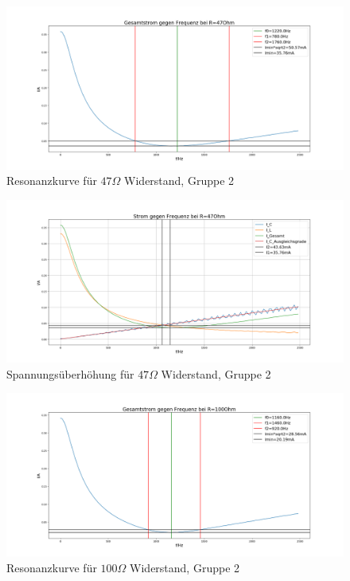 \documentclass[a4paper, 11pt]{article}
\begin{document}
\begin{figure}[H]
	\hskip-2cm
	\includegraphics[trim = 0mm 0mm 0mm 0mm,clip, width=20cm]{Bilder/DPParallel47_Breite.png}%
	\caption[Resonanzkurve für $47 \Omega$ Widerstand, Gruppe 2]{Resonanzkurve für $47 \Omega$ Widerstand, Gruppe 2}%
	\label{pic:Abbildung 3}%
\end{figure}
\begin{figure}[H]
	\hskip-2cm
	\includegraphics[trim = 0mm 0mm 0mm 0mm,clip, width=20cm]{Bilder/DPParallel47_Erhoehung.png}%
	\caption[Spannungsüberhöhung für $47 \Omega$ Widerstand, Gruppe 2]{Spannungsüberhöhung für $47 \Omega$ Widerstand, Gruppe 2}%
	\label{pic:Abbildung 3}%
\end{figure}
\begin{figure}[H]
	\hskip-2cm
	\includegraphics[trim = 0mm 0mm 0mm 0mm,clip, width=20cm]{Bilder/DPParallel100_Breite.png}%
	\caption[Resonanzkurve für $100 \Omega$ Widerstand, Gruppe 2]{Resonanzkurve für $100 \Omega$ Widerstand, Gruppe 2}%
	\label{pic:Abbildung 3}%
\end{figure}
\end{document}
